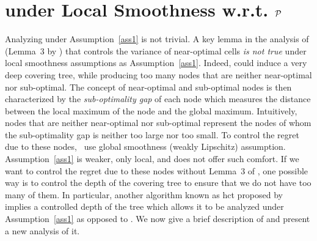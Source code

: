 \section{\HCT{} under Local Smoothness w.r.t. \texorpdfstring{$\mathcal{P}$}{}}\label{sec:gpo.hct}

Analyzing \HOO{} under Assumption~\ref{ass1} is not trivial. A key lemma in the analysis of \HOO  (Lemma~3 by \citealt{bubeck2011pure}) that controls the variance of near-optimal cells \emph{is not true} under local smoothness assumptions as Assumption~\ref{ass1}. Indeed, \HOO could induce a very deep covering tree,  while producing too many nodes that are neither near-optimal nor sub-optimal. The concept of near-optimal and sub-optimal nodes is then characterized by the \emph{sub-optimality gap} of each node which measures the distance between the local maximum of the node and the global maximum. Intuitively, nodes that are neither near-optimal nor sub-optimal represent the nodes of whom the sub-optimality gap is neither too large nor too small. To control the regret due to these nodes,~\cite{bubeck2011pure} use global smoothness (weakly Lipschitz) assumption. Assumption~\ref{ass1} is weaker, only local, and does not offer such comfort. If we want to control the regret due to these nodes without Lemma~3 of \citet{bubeck2011pure}, one possible way is to control the depth of the covering tree to ensure that we do not have too many of them. In particular, another algorithm known as \gls{hct} proposed by~\cite{azar2014online} implies a controlled depth of the tree which allows it to be analyzed under Assumption~\ref{ass1} as opposed to \HOO{}. We now give a brief description of \HCT{} and present a new analysis of it.

